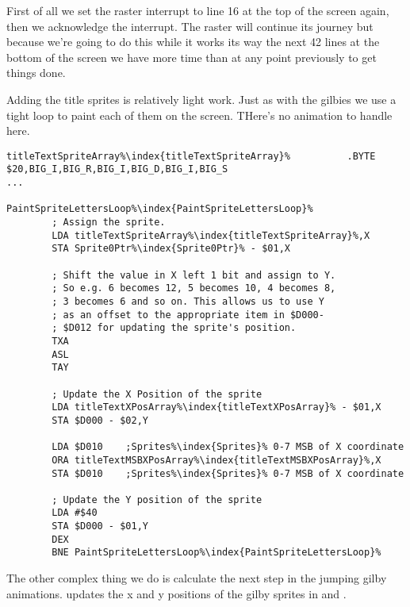 First of all we set the raster interrupt to line 16 at the top of the screen again, then we acknowledge the interrupt. The
raster will continue its journey but because we're going to do this while it works its way the next 42 lines at the bottom 
of the screen we have more time than at any point previously to get things done.

Adding the title sprites is relatively light work. Just as with the gilbies we use a tight loop to paint each of them
on the screen. THere's no animation to handle here.

\begin{lstlisting}[escapechar=\%]
titleTextSpriteArray%\index{titleTextSpriteArray}%          .BYTE $20,BIG_I,BIG_R,BIG_I,BIG_D,BIG_I,BIG_S
...

PaintSpriteLettersLoop%\index{PaintSpriteLettersLoop}%   
        ; Assign the sprite.
        LDA titleTextSpriteArray%\index{titleTextSpriteArray}%,X
        STA Sprite0Ptr%\index{Sprite0Ptr}% - $01,X

        ; Shift the value in X left 1 bit and assign to Y.
        ; So e.g. 6 becomes 12, 5 becomes 10, 4 becomes 8,
        ; 3 becomes 6 and so on. This allows us to use Y
        ; as an offset to the appropriate item in $D000-
        ; $D012 for updating the sprite's position.
        TXA
        ASL
        TAY

        ; Update the X Position of the sprite
        LDA titleTextXPosArray%\index{titleTextXPosArray}% - $01,X
        STA $D000 - $02,Y

        LDA $D010    ;Sprites%\index{Sprites}% 0-7 MSB of X coordinate
        ORA titleTextMSBXPosArray%\index{titleTextMSBXPosArray}%,X
        STA $D010    ;Sprites%\index{Sprites}% 0-7 MSB of X coordinate

        ; Update the Y position of the sprite
        LDA #$40
        STA $D000 - $01,Y
        DEX
        BNE PaintSpriteLettersLoop%\index{PaintSpriteLettersLoop}%

\end{lstlisting}

The other complex thing we do is calculate the next step in the jumping gilby animations. 
updates the x and y positions of the gilby sprites in  and .

